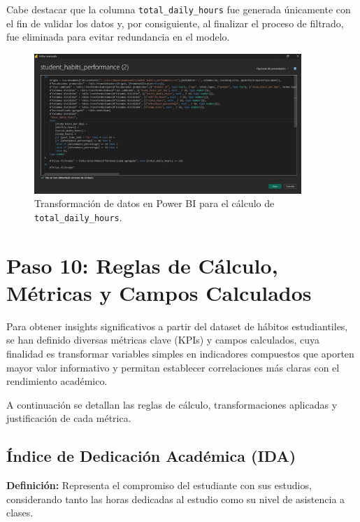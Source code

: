 \documentclass[12pt,letterpaper]{report}
\begin{document}
Cabe destacar que la columna \texttt{total\_daily\_hours} fue generada únicamente con el fin de validar los datos y, por consiguiente, al finalizar el proceso de filtrado, fue eliminada para evitar redundancia en el modelo.

\begin{figure}[H]
    \centering
    \includegraphics[width=0.9\textwidth]{imagenes/total_daily_hours.png}
    \caption{Transformación de datos en Power BI para el cálculo de \texttt{total\_daily\_hours}.}
\end{figure}



\section{Paso 10: Reglas de Cálculo, Métricas y Campos Calculados}

Para obtener insights significativos a partir del dataset de hábitos estudiantiles, se han definido diversas métricas clave (KPIs) y campos calculados, cuya finalidad es transformar variables simples en indicadores compuestos que aporten mayor valor informativo y permitan establecer correlaciones más claras con el rendimiento académico.

A continuación se detallan las reglas de cálculo, transformaciones aplicadas y justificación de cada métrica.

\subsection{Índice de Dedicación Académica (IDA)}

\textbf{Definición:} Representa el compromiso del estudiante con sus estudios, considerando tanto las horas dedicadas al estudio como su nivel de asistencia a clases.
\end{document}

